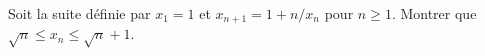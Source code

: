 Soit la suite définie par $x_1 = 1$ et $x_{n+1} = 1 + n/x_n$ pour $n \geq 1$. Montrer que $\sqrt{n} \leq x_n \leq \sqrt{n} + 1$.
